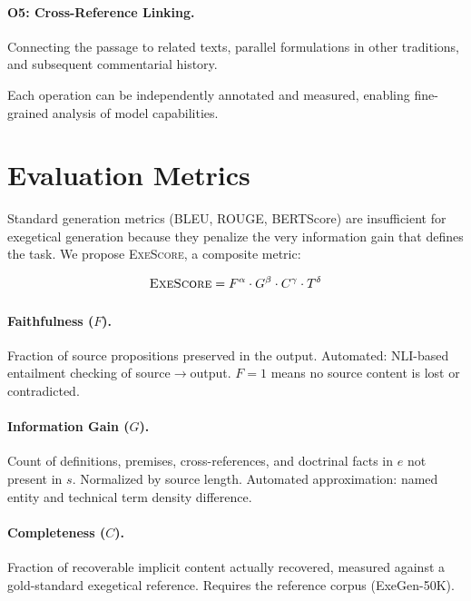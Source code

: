 \documentclass[11pt]{article}
\begin{document}
\paragraph{O5: Cross-Reference Linking.}
Connecting the passage to related texts, parallel formulations in other traditions, and subsequent commentarial history.

Each operation can be independently annotated and measured, enabling fine-grained analysis of model capabilities.


\section{Evaluation Metrics}
\label{sec:metrics}

Standard generation metrics (BLEU, ROUGE, BERTScore) are insufficient for exegetical generation because they penalize the very information gain that defines the task. We propose \textsc{ExeScore}, a composite metric:

\begin{equation}
    \textsc{ExeScore} = F^\alpha \cdot G^\beta \cdot C^\gamma \cdot T^\delta
\end{equation}

\paragraph{Faithfulness ($F$).} Fraction of source propositions preserved in the output. Automated: NLI-based entailment checking of source$\rightarrow$output. $F = 1$ means no source content is lost or contradicted.

\paragraph{Information Gain ($G$).} Count of definitions, premises, cross-references, and doctrinal facts in $e$ not present in $s$. Normalized by source length. Automated approximation: named entity and technical term density difference.

\paragraph{Completeness ($C$).} Fraction of recoverable implicit content actually recovered, measured against a gold-standard exegetical reference. Requires the reference corpus (ExeGen-50K).
\end{document}
